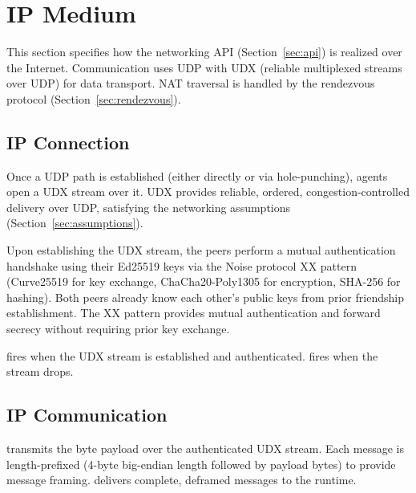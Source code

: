\section{IP Medium}
\label{sec:ip}
This section specifies how the networking API (Section~\ref{sec:api}) is realized over the Internet.  Communication uses UDP with UDX (reliable multiplexed streams over UDP) for data transport.  NAT traversal is handled by the rendezvous protocol (Section~\ref{sec:rendezvous}).

\subsection{IP Connection}
\label{sec:ip-connection}
Once a UDP path is established (either directly or via hole-punching), agents open a UDX stream over it. UDX provides reliable, ordered, congestion-controlled delivery over UDP, satisfying the networking assumptions (Section~\ref{sec:assumptions}).

Upon establishing the UDX stream, the peers perform a mutual authentication handshake using their Ed25519 keys via the Noise protocol XX pattern (Curve25519 for key exchange, ChaCha20-Poly1305 for encryption, SHA-256 for hashing). Both peers already know each other's public keys from prior friendship establishment. The XX pattern provides mutual authentication and forward secrecy without requiring prior key exchange.

 fires when the UDX stream is established and authenticated.  fires when the stream drops.

\subsection{IP Communication}
\label{sec:ip-comm}
 transmits the byte payload over the authenticated UDX stream. Each message is length-prefixed (4-byte big-endian length followed by payload bytes) to provide message framing.  delivers complete, deframed messages to the runtime.
